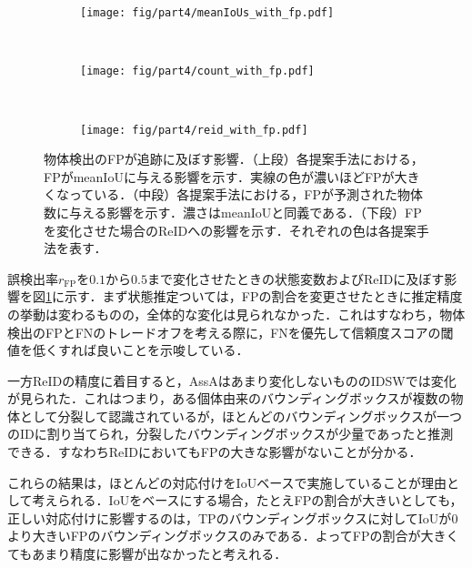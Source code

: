         \begin{figure}[t]
            \begin{subfigure}[t]{\linewidth}
                \centering
                \texttt{[image: fig/part4/meanIoUs\_with\_fp.pdf]}
            \end{subfigure}
            \\
            \begin{subfigure}[t]{\linewidth}
                \centering
                \texttt{[image: fig/part4/count\_with\_fp.pdf]}
            \end{subfigure}
            \\
            \begin{subfigure}[t]{\linewidth}
                \centering
                \texttt{[image: fig/part4/reid\_with\_fp.pdf]}
            \end{subfigure}
            \caption[物体検出のFPが追跡に及ぼす影響]{物体検出のFPが追跡に及ぼす影響．（上段）各提案手法における，FPがmeanIoUに与える影響を示す．実線の色が濃いほどFPが大きくなっている．（中段）各提案手法における，FPが予測された物体数に与える影響を示す．濃さはmeanIoUと同義である．（下段）FPを変化させた場合のReIDへの影響を示す．それぞれの色は各提案手法を表す．}
            \label{fig:FP_effect}
        \end{figure}

        誤検出率$r_{\text{FP}}$を$0.1$から$0.5$まで変化させたときの状態変数およびReIDに及ぼす影響を図\ref{fig:FP_effect}に示す．まず状態推定ついては，FPの割合を変更させたときに推定精度の挙動は変わるものの，全体的な変化は見られなかった．これはすなわち，物体検出のFPとFNのトレードオフを考える際に，FNを優先して信頼度スコアの閾値を低くすれば良いことを示唆している．

        一方ReIDの精度に着目すると，AssAはあまり変化しないもののIDSWでは変化が見られた．これはつまり，ある個体由来のバウンディングボックスが複数の物体として分裂して認識されているが，ほとんどのバウンディングボックスが一つのIDに割り当てられ，分裂したバウンディングボックスが少量であったと推測できる．すなわちReIDにおいてもFPの大きな影響がないことが分かる．

        これらの結果は，ほとんどの対応付けをIoUベースで実施していることが理由として考えられる．IoUをベースにする場合，たとえFPの割合が大きいとしても，正しい対応付けに影響するのは，TPのバウンディングボックスに対してIoUが$0$より大きいFPのバウンディングボックスのみである．よってFPの割合が大きくてもあまり精度に影響が出なかったと考えれる．

